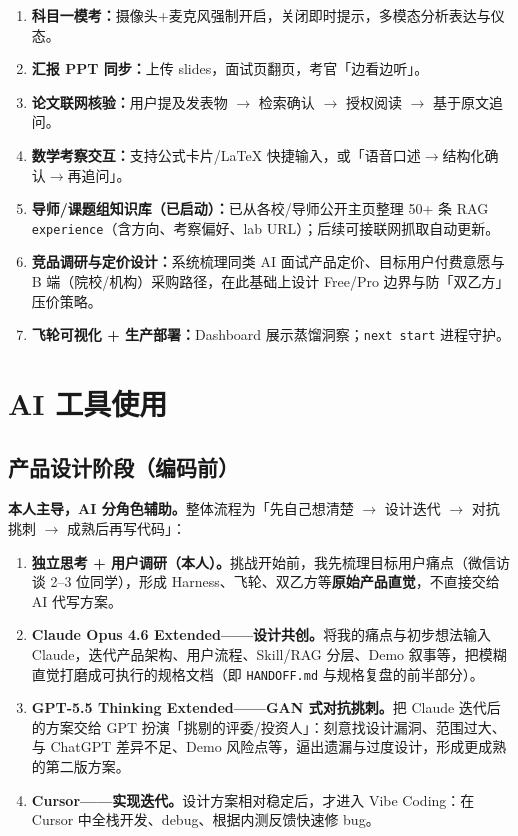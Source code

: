 \documentclass[11pt, a4paper]{article}
\begin{document}
\begin{enumerate}
  \item \textbf{科目一模考：}摄像头+麦克风强制开启，关闭即时提示，多模态分析表达与仪态。
  \item \textbf{汇报 PPT 同步：}上传 slides，面试页翻页，考官「边看边听」。
  \item \textbf{论文联网核验：}用户提及发表物 $\to$ 检索确认 $\to$ 授权阅读 $\to$ 基于原文追问。
  \item \textbf{数学考察交互：}支持公式卡片/LaTeX 快捷输入，或「语音口述$\to$结构化确认$\to$再追问」。
  \item \textbf{导师/课题组知识库（已启动）：}已从各校/导师公开主页整理 50+ 条 RAG \texttt{experience}（含方向、考察偏好、lab URL）；后续可接联网抓取自动更新。
  \item \textbf{竞品调研与定价设计：}系统梳理同类 AI 面试产品定价、目标用户付费意愿与 B 端（院校/机构）采购路径，在此基础上设计 Free/Pro 边界与防「双乙方」压价策略。
  \item \textbf{飞轮可视化 + 生产部署：}Dashboard 展示蒸馏洞察；\texttt{next start} 进程守护。
\end{enumerate}

\section{AI 工具使用}

\subsection{产品设计阶段（编码前）}

\noindent\textbf{本人主导，AI 分角色辅助。}整体流程为「先自己想清楚 $\to$ 设计迭代 $\to$ 对抗挑刺 $\to$ 成熟后再写代码」：

\begin{enumerate}
  \item \textbf{独立思考 + 用户调研（本人）。}挑战开始前，我先梳理目标用户痛点（微信访谈 2--3 位同学），形成 Harness、飞轮、双乙方等\textbf{原始产品直觉}，不直接交给 AI 代写方案。
  \item \textbf{Claude Opus 4.6 Extended——设计共创。}将我的痛点与初步想法输入 Claude，迭代产品架构、用户流程、Skill/RAG 分层、Demo 叙事等，把模糊直觉打磨成可执行的规格文档（即 \texttt{HANDOFF.md} 与规格复盘的前半部分）。
  \item \textbf{GPT-5.5 Thinking Extended——GAN 式对抗挑刺。}把 Claude 迭代后的方案交给 GPT 扮演「挑剔的评委/投资人」：刻意找设计漏洞、范围过大、与 ChatGPT 差异不足、Demo 风险点等，逼出遗漏与过度设计，形成更成熟的第二版方案。
  \item \textbf{Cursor——实现迭代。}设计方案相对稳定后，才进入 Vibe Coding：在 Cursor 中全栈开发、debug、根据内测反馈快速修 bug。
\end{enumerate}
\end{document}
